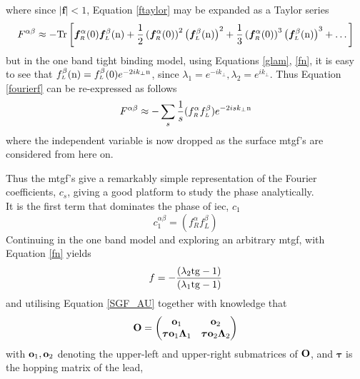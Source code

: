 \documentclass[a4paper, 12pt]{article}
\begin{document}
where since $|\bm f| <1$, Equation \eqref{ftaylor} may be expanded as a Taylor series
\begin{equation}\label{fourierf}
	F^{\alpha\beta} \approx -{\rm Tr}\left[\bm f_{\scriptscriptstyle R}^{\alpha}(0) \bm f_{\scriptscriptstyle L}^{\beta}({\rm n})+\frac{1}{2}\left(\bm f_{\scriptscriptstyle R}^{\alpha}(0)\right)^2 \left(\bm f_{\scriptscriptstyle L}^{\beta}({\rm n})\right)^2+\frac{1}{3}\left(\bm f_{\scriptscriptstyle R}^{\alpha}(0)\right)^3 \left(\bm f_{\scriptscriptstyle L}^{\beta}({\rm n})\right)^3+\dots\right]
\end{equation}
but in the one band tight binding model, using Equations \eqref{glam}, \eqref{fn}, it is easy to see that $f_{\scriptscriptstyle L}^{\beta}({\rm n}) = f_{\scriptscriptstyle L}^{\beta}({\rm 0})e^{-2ik_\perp \rm n}$, since $\lambda_1 = e^{-ik_\perp}, \lambda_2 = e^{ik_\perp}$. Thus Equation \eqref{fourierf} can be re-expressed as follows
\begin{equation}\label{fs}
	F^{\alpha\beta} \approx -\sum_s \frac{1}{s}(f_{\scriptscriptstyle R}^\alpha f_{\scriptscriptstyle L}^\beta)e^{-2isk_\perp {\rm n}}
\end{equation}
where the independent variable is now dropped as the surface \gls{mtgf}'s are considered from here on.
\par Thus the \gls{mtgf}'s give a remarkably simple representation of the Fourier coefficients, $c_s$, giving a good platform to study the phase analytically.
\\[2mm] It is the first term that dominates the phase of \gls{iec}, $c_1$
\begin{equation}
	c_1^{\alpha\beta} = (f_{\scriptscriptstyle R}^\alpha f_{\scriptscriptstyle L}^\beta)
\end{equation}
Continuing in the one band model and exploring an arbitrary \gls{mtgf}, with Equation \eqref{fn} yields
\begin{equation}
	f = -\frac{(\lambda_2{\rm t g} - 1)}{(\lambda_1 {\rm t g} - 1)}
\end{equation}
and utilising Equation \eqref{SGF_AU} together with knowledge that 
\begin{equation}
	{\bf O} = \begin{pmatrix} {\bf o}_1&{\bf o}_2\\{\bf \bm \tau o}_1\bm\Lambda_1&{\bf \bm \tau o}_2\bm\Lambda_2 \end{pmatrix}
\end{equation}
with ${\bf o}_1, {\bf o}_2$ denoting the upper-left and upper-right submatrices of $\bf O$, and $\bm \tau$ is the hopping matrix of the lead,
\end{document}
